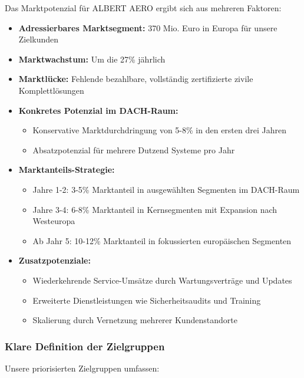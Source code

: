 \documentclass[11pt,a4paper]{article}
\begin{document}
Das Marktpotenzial für ALBERT AERO ergibt sich aus mehreren Faktoren:

\begin{itemize}
\item \textbf{Adressierbares Marktsegment:} 370 Mio. Euro in Europa für unsere Zielkunden
\item \textbf{Marktwachstum:} Um die 27\% jährlich
\item \textbf{Marktlücke:} Fehlende bezahlbare, vollständig zertifizierte zivile Komplettlösungen

\item \textbf{Konkretes Potenzial im DACH-Raum:}
\begin{itemize}
\item Konservative Marktdurchdringung von 5-8\% in den ersten drei Jahren
\item Absatzpotenzial für mehrere Dutzend Systeme pro Jahr
\end{itemize}

\item \textbf{Marktanteils-Strategie:}
\begin{itemize}
\item Jahre 1-2: 3-5\% Marktanteil in ausgewählten Segmenten im DACH-Raum
\item Jahre 3-4: 6-8\% Marktanteil in Kernsegmenten mit Expansion nach Westeuropa
\item Ab Jahr 5: 10-12\% Marktanteil in fokussierten europäischen Segmenten
\end{itemize}

\item \textbf{Zusatzpotenziale:}
\begin{itemize}
\item Wiederkehrende Service-Umsätze durch Wartungsverträge und Updates
\item Erweiterte Dienstleistungen wie Sicherheitsaudits und Training
\item Skalierung durch Vernetzung mehrerer Kundenstandorte
\end{itemize}
\end{itemize}

\subsubsection*{Klare Definition der Zielgruppen}

Unsere priorisierten Zielgruppen umfassen:
\end{document}
